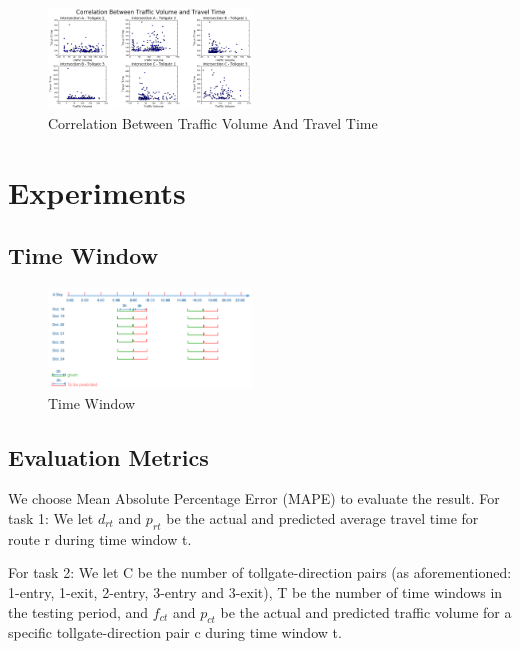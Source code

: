 \documentclass[journal, letterpaper]{IEEEtran}
\begin{document}
\begin{figure} [H]
  \centering
  \includegraphics[width=0.48\textwidth]{corr_volume_time.png}
  \caption{Correlation Between Traffic Volume And Travel Time}
  \captionsetup{justification=centering}
  \label{fig:11}
\end{figure} 

\section{Experiments}
\large
\subsection{Time Window}

\begin{figure} [H]
  \centering
  \includegraphics[width=0.48\textwidth]{time-window.png}
  \caption{Time Window}
  \label{fig:12}
\end{figure}

\subsection{Evaluation Metrics}

We choose Mean Absolute Percentage Error (MAPE) to evaluate the result. 
For task 1: We let $d_{rt}$ and $p_{rt}$ be the actual and predicted average travel time for route r during time window t. 

For task 2: We let C be the number of tollgate-direction pairs (as aforementioned: 1-entry, 1-exit, 2-entry, 3-entry and 3-exit), T be the number of time windows in the testing period, and $f_{ct}$ and $p_{ct}$ be the actual and predicted traffic volume for a specific tollgate-direction pair c during time window t. 
\end{document}
